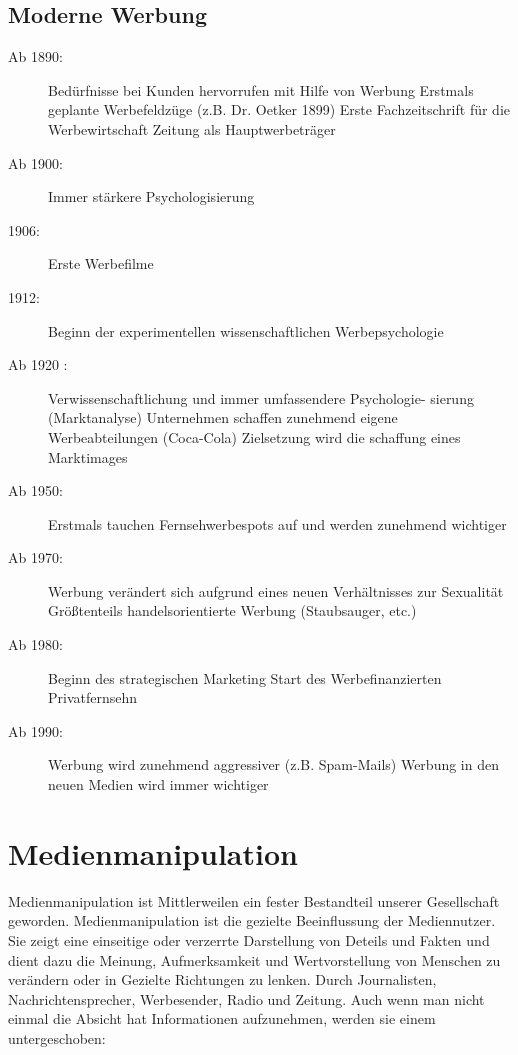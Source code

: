 \subsection{Moderne Werbung}
\begin{description}
	\item[Ab 1890:] Bedürfnisse bei Kunden hervorrufen mit Hilfe von Werbung
Erstmals geplante Werbefeldzüge (z.B. Dr. Oetker 1899)
Erste Fachzeitschrift für die Werbewirtschaft
Zeitung als Hauptwerbeträger

	\item[Ab 1900:] Immer stärkere Psychologisierung
	\item[1906:] Erste Werbefilme
	\item[1912:] Beginn der experimentellen wissenschaftlichen
Werbepsychologie
	\item[Ab 1920	:] Verwissenschaftlichung und immer umfassendere Psychologie-
sierung (Marktanalyse)
Unternehmen schaffen zunehmend eigene Werbeabteilungen
(Coca-Cola)
Zielsetzung wird die schaffung eines Marktimages
	\item[Ab 1950:] Erstmals tauchen Fernsehwerbespots auf und werden zunehmend wichtiger
	\item[Ab 1970:] Werbung verändert sich aufgrund eines neuen Verhältnisses zur Sexualität
	Größtenteils handelsorientierte Werbung (Staubsauger, etc.)

	\item[Ab 1980:] Beginn des strategischen Marketing
	Start des Werbefinanzierten Privatfernsehn

	\item[Ab 1990:] Werbung wird zunehmend aggressiver (z.B. Spam-Mails)
	Werbung in den neuen Medien wird immer wichtiger
\end{description}

\section{Medienmanipulation}
Medienmanipulation ist Mittlerweilen ein fester Bestandteil unserer Gesellschaft
geworden. Medienmanipulation ist die gezielte Beeinflussung der Mediennutzer. Sie zeigt
eine einseitige oder verzerrte Darstellung von Deteils und Fakten und dient dazu
die Meinung, Aufmerksamkeit und Wertvorstellung von Menschen zu verändern oder in
Gezielte Richtungen zu lenken. Durch Journalisten, Nachrichtensprecher, Werbesender,
Radio und Zeitung. Auch wenn man nicht einmal die Absicht hat Informationen aufzunehmen, werden sie
einem untergeschoben:

